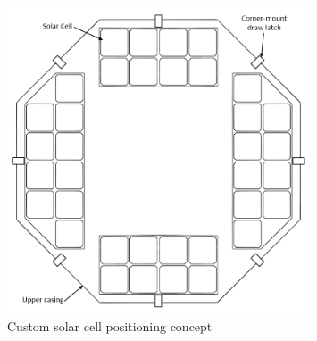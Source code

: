\begin{figure}[H]
    \centering
    \includegraphics[width=0.8\textwidth]{3_DesignConcepts/img/C3/solarcells_ann.PNG}
    \caption{Custom solar cell positioning concept}
    \label{fig:solarcells}
\end{figure}